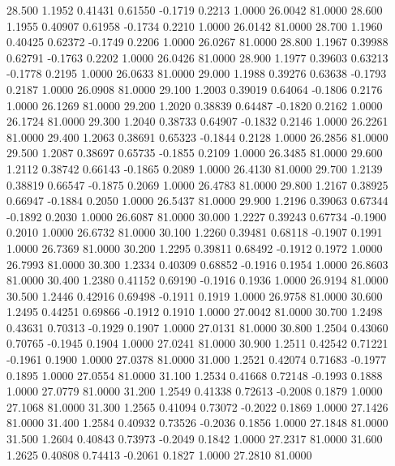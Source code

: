   28.500   1.1952   0.41431   0.61550  -0.1719   0.2213   1.0000  26.0042  81.0000
  28.600   1.1955   0.40907   0.61958  -0.1734   0.2210   1.0000  26.0142  81.0000
  28.700   1.1960   0.40425   0.62372  -0.1749   0.2206   1.0000  26.0267  81.0000
  28.800   1.1967   0.39988   0.62791  -0.1763   0.2202   1.0000  26.0426  81.0000
  28.900   1.1977   0.39603   0.63213  -0.1778   0.2195   1.0000  26.0633  81.0000
  29.000   1.1988   0.39276   0.63638  -0.1793   0.2187   1.0000  26.0908  81.0000
  29.100   1.2003   0.39019   0.64064  -0.1806   0.2176   1.0000  26.1269  81.0000
  29.200   1.2020   0.38839   0.64487  -0.1820   0.2162   1.0000  26.1724  81.0000
  29.300   1.2040   0.38733   0.64907  -0.1832   0.2146   1.0000  26.2261  81.0000
  29.400   1.2063   0.38691   0.65323  -0.1844   0.2128   1.0000  26.2856  81.0000
  29.500   1.2087   0.38697   0.65735  -0.1855   0.2109   1.0000  26.3485  81.0000
  29.600   1.2112   0.38742   0.66143  -0.1865   0.2089   1.0000  26.4130  81.0000
  29.700   1.2139   0.38819   0.66547  -0.1875   0.2069   1.0000  26.4783  81.0000
  29.800   1.2167   0.38925   0.66947  -0.1884   0.2050   1.0000  26.5437  81.0000
  29.900   1.2196   0.39063   0.67344  -0.1892   0.2030   1.0000  26.6087  81.0000
  30.000   1.2227   0.39243   0.67734  -0.1900   0.2010   1.0000  26.6732  81.0000
  30.100   1.2260   0.39481   0.68118  -0.1907   0.1991   1.0000  26.7369  81.0000
  30.200   1.2295   0.39811   0.68492  -0.1912   0.1972   1.0000  26.7993  81.0000
  30.300   1.2334   0.40309   0.68852  -0.1916   0.1954   1.0000  26.8603  81.0000
  30.400   1.2380   0.41152   0.69190  -0.1916   0.1936   1.0000  26.9194  81.0000
  30.500   1.2446   0.42916   0.69498  -0.1911   0.1919   1.0000  26.9758  81.0000
  30.600   1.2495   0.44251   0.69866  -0.1912   0.1910   1.0000  27.0042  81.0000
  30.700   1.2498   0.43631   0.70313  -0.1929   0.1907   1.0000  27.0131  81.0000
  30.800   1.2504   0.43060   0.70765  -0.1945   0.1904   1.0000  27.0241  81.0000
  30.900   1.2511   0.42542   0.71221  -0.1961   0.1900   1.0000  27.0378  81.0000
  31.000   1.2521   0.42074   0.71683  -0.1977   0.1895   1.0000  27.0554  81.0000
  31.100   1.2534   0.41668   0.72148  -0.1993   0.1888   1.0000  27.0779  81.0000
  31.200   1.2549   0.41338   0.72613  -0.2008   0.1879   1.0000  27.1068  81.0000
  31.300   1.2565   0.41094   0.73072  -0.2022   0.1869   1.0000  27.1426  81.0000
  31.400   1.2584   0.40932   0.73526  -0.2036   0.1856   1.0000  27.1848  81.0000
  31.500   1.2604   0.40843   0.73973  -0.2049   0.1842   1.0000  27.2317  81.0000
  31.600   1.2625   0.40808   0.74413  -0.2061   0.1827   1.0000  27.2810  81.0000
